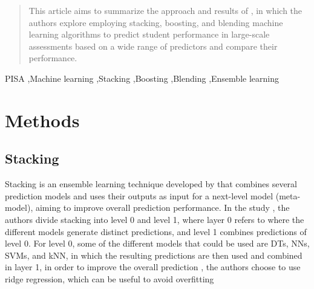 \documentclass[final,5p,times,twocolumn,authoryear]{elsarticle}
\begin{document}
\begin{frontmatter}


  \begin{abstract}
    This article aims to summarize the approach and results of \cite{Stacking}, in which the authors explore employing stacking, boosting, and blending machine learning algorithms to predict student performance in large-scale assessments based on a wide range of predictors and compare their performance.
  \end{abstract}

  \begin{keyword}
    PISA \sep Machine learning \sep Stacking \sep Boosting \sep Blending \sep Ensemble
    learning
  \end{keyword}

\end{frontmatter}









\section{Methods}

\subsection{Stacking}
Stacking is an ensemble learning technique developed by \cite{WOLPERT1992241} that combines several prediction models and uses their outputs as input for a next-level model (meta-model), aiming to improve overall prediction performance\cite{Stacking}. In the study \cite{Stacking}, the authors divide stacking into level 0 and level 1, where layer 0 refers to where the different models generate distinct predictions, and level 1 combines predictions of level 0. For level 0, some of the different models that could be used are DTs, NNs, SVMs, and kNN, in which the resulting predictions are then used and combined in layer 1, in order to improve the overall prediction \cite{WOLPERT1992241}, the authors choose to use ridge regression, which can be useful to avoid overfitting \cite{CUI2021107038}
\end{document}
